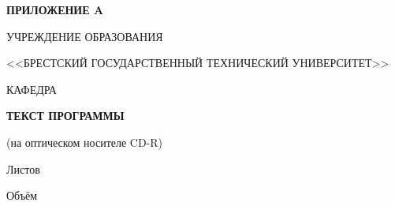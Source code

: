 \begin{center}
    \hspace{.6\textwidth}\textbf{ПРИЛОЖЕНИЕ A}

    \hspace{0pt}

    УЧРЕЖДЕНИЕ ОБРАЗОВАНИЯ

    <<БРЕСТСКИЙ ГОСУДАРСТВЕННЫЙ ТЕХНИЧЕСКИЙ УНИВЕРСИТЕТ>>

    \hspace{0pt}

    КАФЕДРА \titlePageKafedra
\end{center}

\vfill

\begin{center}
    \titlePageTopic

    \hspace{0pt}

    \textbf{ТЕКСТ ПРОГРАММЫ}

    (на оптическом носителе CD-R)
\end{center}

\vfill

\begin{center}
    \codeA

    \hspace{0pt}

    \begin{flushright}
        \begin{minipage}[t]{.5\textwidth}
            Листов \pageref{LastPage}

            Объём \diskVolume
        \end{minipage}
    \end{flushright}
\end{center}

\vfill

